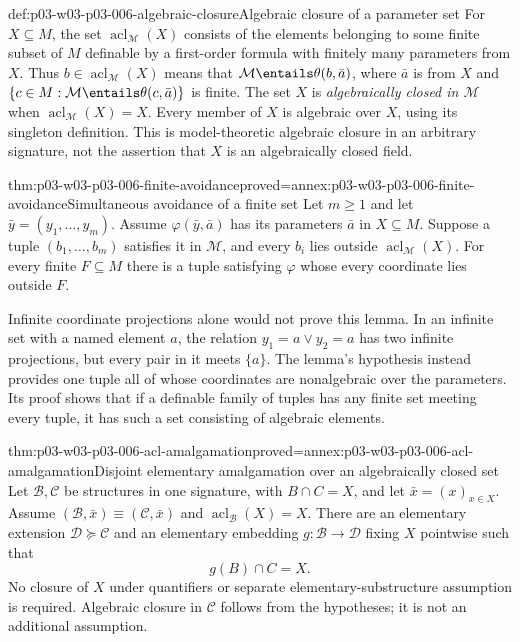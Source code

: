 \begin{hbdefinition}{def:p03-w03-p03-006-algebraic-closure}{Algebraic closure of a parameter set}
For \(X\subseteq M\), the set \(\operatorname{acl}_{\mathcal M}(X)\)
consists of the elements belonging to some finite subset of \(M\)
definable by a first-order formula with finitely many parameters from
\(X\). Thus \(b\in\operatorname{acl}_{\mathcal M}(X)\) means that
\(\mathcal M\entails\theta(b,\bar a)\), where \(\bar a\) is from
\(X\) and \(\{c\in M:\mathcal M\entails\theta(c,\bar a)\}\) is
finite. The set \(X\) is \emph{algebraically closed in \(\mathcal M\)}
when \(\operatorname{acl}_{\mathcal M}(X)=X\). Every member of \(X\)
is algebraic over \(X\), using its singleton definition. This is
model-theoretic algebraic closure in an arbitrary signature, not the
assertion that \(X\) is an algebraically closed field.
\end{hbdefinition}

\begin{hblemma}{thm:p03-w03-p03-006-finite-avoidance}{proved=annex:p03-w03-p03-006-finite-avoidance}{Simultaneous avoidance of a finite set}
Let \(m\geq1\) and let \(\bar y=(y_1,\ldots,y_m)\). Assume
\(\varphi(\bar y,\bar a)\) has its parameters \(\bar a\) in
\(X\subseteq M\). Suppose a tuple
\((b_1,\ldots,b_m)\) satisfies it in \(\mathcal M\), and every
\(b_i\) lies outside \(\operatorname{acl}_{\mathcal M}(X)\).
For every finite \(F\subseteq M\) there is a tuple satisfying
\(\varphi\) whose every coordinate lies outside \(F\).
\end{hblemma}

Infinite coordinate projections alone would not prove this lemma. In an
infinite set with a named element \(a\), the relation
\(y_1=a\lor y_2=a\) has two infinite projections, but every pair in it
meets \(\{a\}\). The lemma's hypothesis instead provides one tuple
all of whose coordinates are nonalgebraic over the parameters. Its proof
shows that if a definable family of tuples has any finite set meeting
every tuple, it has such a set consisting of algebraic elements.

\begin{hbtheorem}{thm:p03-w03-p03-006-acl-amalgamation}{proved=annex:p03-w03-p03-006-acl-amalgamation}{Disjoint elementary amalgamation over an algebraically closed set}
Let \(\mathcal B,\mathcal C\) be structures in one signature, with
\(B\cap C=X\), and let \(\bar x=(x)_{x\in X}\). Assume
\((\mathcal B,\bar x)\equiv(\mathcal C,\bar x)\) and
\(\operatorname{acl}_{\mathcal B}(X)=X\). There are an elementary
extension \(\mathcal D\succcurlyeq\mathcal C\) and an elementary
embedding \(g:\mathcal B\to\mathcal D\) fixing \(X\) pointwise such
that
\[
 g(B)\cap C=X.
\]
No closure of \(X\) under quantifiers or separate elementary-substructure
assumption is required. Algebraic closure in \(\mathcal C\) follows
from the hypotheses; it is not an additional assumption.
\end{hbtheorem}

